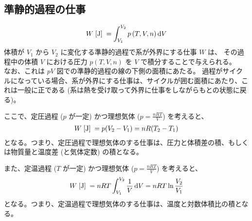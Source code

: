 \documentclass[a4paper,11pt]{jsarticle}
\newcommand{\braunit}[1]{\;\text{[}\unit[per-mode = symbol]{#1}\text{]}\;}
\begin{document}
\subsection*{準静的過程の仕事}
\begin{align*}
  W\braunit{\J} = \int_{V_1}^{V_2} p\left(T, V, n\right)\dd{V}
\end{align*}
体積が $V_1$ から $V_2$ に変化する準静的過程で系が外界にする仕事 $W$ は、
その過程中の体積 $V$ における圧力 $p\left(T, V, n\right)$ を $V$ で積分することで与えられる。\\
なお、これは $pV$ 図での準静的過程の線の下側の面積にあたる。
過程がサイクルになっている場合、系が外界にする仕事は、サイクルが囲む面積にあたり、これは一般に正である
(系は熱を受け取って外界に仕事をしながらもとの状態に戻る)。

ここで、定圧過程 ($p$ が一定) かつ理想気体 ($p = \frac{nRT}{V}$) を考えると、
\begin{align*}
  W\braunit{\J} = p(V_2 - V_1) = nR(T_2 - T_1)
\end{align*}
となる。つまり、定圧過程で理想気体のする仕事は、圧力と体積差の積、もしくは物質量と温度差 (と気体定数) の積となる。

また、定温過程 ($T$ が一定) かつ理想気体 ($p = \frac{nRT}{V}$) を考えると、
\begin{align*}
  W\braunit{\J} = nRT\int_{V_1}^{V_2}\frac{1}{V}\dd{V} = nRT\ln\frac{V_2}{V_1}
\end{align*}
となる。つまり、定温過程で理想気体のする仕事は、温度と対数体積比の積となる。
\cite[pp.48]{thermo}



\end{document}
